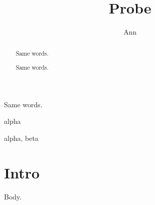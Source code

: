 \documentclass{article}
\makeatletter
\providecommand\lx@add@frontmatter@now[2]{\par#2\par}%
\makeatother
\begin{document}
\title{Probe}\author{Ann}\maketitle
\begin{abstract}Same   words.\end{abstract}
\begin{abstract}Same words.\end{abstract}
\lx@add@frontmatter@now{ltx:abstract}{Same
  words.}
\lx@add@frontmatter@now{ltx:keywords}{alpha}
\lx@add@frontmatter@now{ltx:keywords}{alpha, beta}
\section{Intro}Body.
\end{document}
